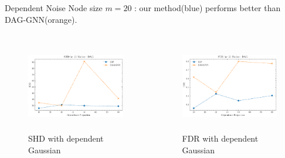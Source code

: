 \documentclass{beamer}
\begin{document}
\begin{frame}[allowframebreaks]{Dependent Noise}
    Node size $m=20$ : our method(blue) performs better than DAG-GNN(orange).
    \begin{columns}
        \begin{column}{0.5\textwidth}
            \begin{figure}
                \centering
                \includegraphics[height=4cm]{fig/SHD_dependence_20_DAG_threshold0.3.pdf}
                \caption{SHD with dependent Gaussian}
                \label{fig:dep_gaussian_shd_20}
            \end{figure}
        \end{column}
        \begin{column}{0.5\textwidth}
            \begin{figure}
                \centering
                \includegraphics[height=4cm]{fig/FDR_dependence_20_DAG_threshold0.3.pdf}
                \caption{FDR with dependent Gaussian}
                \label{fig:dep_gaussian_fdr_20}
            \end{figure}
        \end{column}
    \end{columns}


\end{frame}
\end{document}

